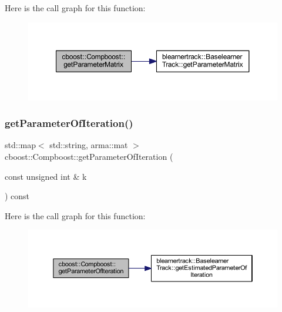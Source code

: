Here is the call graph for this function\+:\nopagebreak
\begin{figure}[H]
\begin{center}
\leavevmode
\includegraphics[width=350pt]{classcboost_1_1_compboost_a1652d7fa10039beaee1998e640f1b68a_cgraph}
\end{center}
\end{figure}
\mbox{\label{classcboost_1_1_compboost_a97b02aa81981e08658d896ff9798b5d0}} 
\subsubsection{\texorpdfstring{get\+Parameter\+Of\+Iteration()}{getParameterOfIteration()}}
{\footnotesize\ttfamily std\+::map$<$ std\+::string, arma\+::mat $>$ cboost\+::\+Compboost\+::get\+Parameter\+Of\+Iteration (\begin{DoxyParamCaption}\item[{const unsigned int \&}]{k }\end{DoxyParamCaption}) const}

Here is the call graph for this function\+:\nopagebreak
\begin{figure}[H]
\begin{center}
\leavevmode
\includegraphics[width=350pt]{classcboost_1_1_compboost_a97b02aa81981e08658d896ff9798b5d0_cgraph}
\end{center}
\end{figure}
\mbox{\label{classcboost_1_1_compboost_a405c6b88de5b053fefdb24742791da4e}} 
